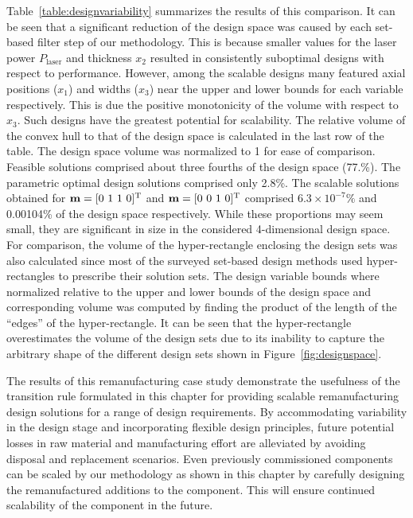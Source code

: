 Table~\ref{table:designvariability} summarizes the results of this comparison. It can be seen that a significant reduction of the design space was caused by each set-based filter step of our methodology. This is because smaller values for the laser power $P_{\textrm{laser}}$ and thickness $x_2$ resulted in consistently suboptimal designs with respect to performance. However, among the scalable designs many featured axial positions ($x_1$) and widths ($x_3$) near the upper and lower bounds for each variable respectively. This is due the positive monotonicity of the volume with respect to $x_3$. Such designs have the greatest potential for scalability. The relative volume of the convex hull to that of the design space is calculated in the last row of the table. The design space volume was normalized to 1 for ease of comparison. Feasible solutions comprised about three fourths of the design space (77.\%). The parametric optimal design solutions comprised only 2.8\%. The scalable solutions obtained for $\mathbf{m} = [0~1~1~0]^{\text T}$ and $\mathbf{m} = [0~0~1~0]^{\text T}$ comprised $6.3\times10^{-7}\%$ and 0.00104\% of the design space respectively. While these proportions may seem small, they are significant in size in the considered 4-dimensional design space. For comparison, the volume of the hyper-rectangle enclosing the design sets was also calculated since most of the surveyed set-based design methods used hyper-rectangles to prescribe their solution sets. The design variable bounds where normalized relative to the upper and lower bounds of the design space and corresponding volume was computed by finding the product of the length of the ``edges'' of the hyper-rectangle. It can be seen that the hyper-rectangle overestimates the volume of the design sets due to its inability to capture the arbitrary shape of the different design sets shown in Figure~\ref{fig:designspace}. 

The results of this remanufacturing case study  demonstrate the usefulness of the transition rule formulated in this chapter for providing scalable remanufacturing design solutions for a range of design requirements. By accommodating variability in the design stage and incorporating flexible design principles, future potential losses in raw material and manufacturing effort are alleviated by avoiding disposal and replacement scenarios. Even previously commissioned components can be scaled by our methodology as shown in this chapter by carefully designing the remanufactured additions to the component. This will ensure continued scalability of the component in the future.

